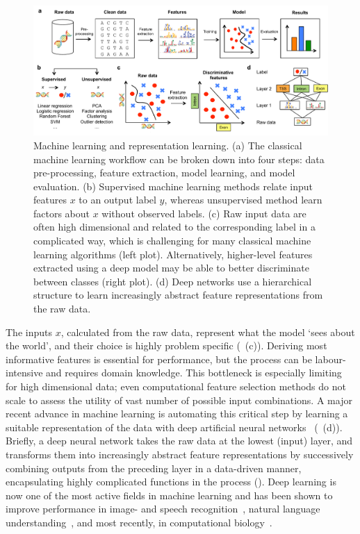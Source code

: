 \begin{figure}[htbp!]
\centering
\includegraphics[width=1.0\textwidth]{ml}
\caption[Machine learning and representation learning.]{Machine learning and representation learning. (a) The classical machine learning workflow can be broken down into four steps: data pre-processing, feature extraction, model learning, and model evaluation. (b) Supervised machine learning methods relate input features $x$ to an output label $y$, whereas unsupervised method learn factors about $x$ without observed labels. (c) Raw input data are often high dimensional and related to the corresponding label in a complicated way, which is challenging for many classical machine learning algorithms (left plot). Alternatively, higher-level features extracted using a deep model may be able to better discriminate between classes (right plot). (d) Deep networks use a hierarchical structure to learn increasingly abstract feature representations from the raw data.}
\label{fig:dl_ml}
\end{figure}

The inputs $x$, calculated from the raw data, represent what the model `sees about the world', and their choice is highly problem specific (~(c)). Deriving most informative features is essential for performance, but the process can be labour-intensive and requires domain knowledge. This bottleneck is especially limiting for high dimensional data; even computational feature selection methods do not scale to assess the utility of vast number of possible input combinations. A major recent advance in machine learning is automating this critical step by learning a suitable representation of the data with deep artificial neural networks~\citep{bengio_representation_2013,lecun_deep_2015,schmidhuber_deep_2015} (~(d)). Briefly, a deep neural network takes the raw data at the lowest (input) layer, and transforms them into increasingly abstract feature representations by successively combining outputs from the preceding layer in a data-driven manner, encapsulating highly complicated functions in the process (). Deep learning is now one of the most active fields in machine learning and has been shown to improve performance in image- and speech recognition~\citep{deng_deep_2015,graves_generating_2013,hinton_deep_2012,krizhevsky_imagenet_2012,zeiler_visualizing_2014-1}, natural language understanding~\citep{bahdanau_neural_2014,lipton_critical_2015,sutskever_sequence_2014,xiong_dynamic_2016}, and most recently, in computational biology~\citep{alipanahi_predicting_2015,dahl_multi-task_2014,eickholt_dndisorder:_2013,kelley_basset:_2016,leung_deep_2014,sonderby_protein_2014,wang_chromatin_2015,zhou_predicting_2015}.

